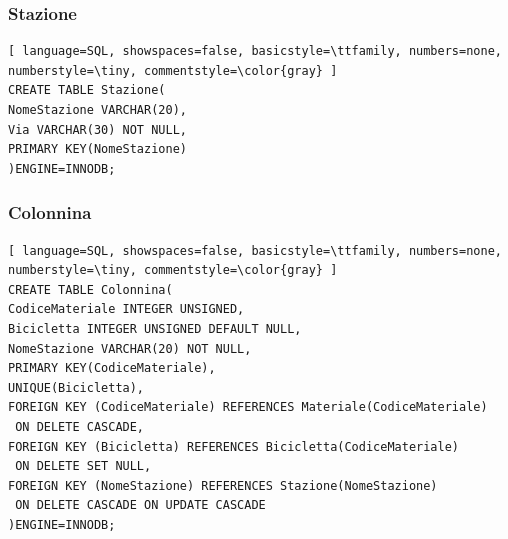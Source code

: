 \documentclass[a4paper,twoside]{article}
\begin{document}
\subsubsection{Stazione}
\begin{lstlisting}[ language=SQL, showspaces=false, basicstyle=\ttfamily, numbers=none, numberstyle=\tiny, commentstyle=\color{gray} ]
CREATE TABLE Stazione(
NomeStazione VARCHAR(20),
Via VARCHAR(30) NOT NULL,
PRIMARY KEY(NomeStazione)
)ENGINE=INNODB;
\end{lstlisting}
\subsubsection{Colonnina}
\begin{lstlisting}[ language=SQL, showspaces=false, basicstyle=\ttfamily, numbers=none, numberstyle=\tiny, commentstyle=\color{gray} ]
CREATE TABLE Colonnina(
CodiceMateriale INTEGER UNSIGNED,
Bicicletta INTEGER UNSIGNED DEFAULT NULL,
NomeStazione VARCHAR(20) NOT NULL,
PRIMARY KEY(CodiceMateriale),
UNIQUE(Bicicletta),
FOREIGN KEY (CodiceMateriale) REFERENCES Materiale(CodiceMateriale)
 ON DELETE CASCADE,
FOREIGN KEY (Bicicletta) REFERENCES Bicicletta(CodiceMateriale)
 ON DELETE SET NULL,
FOREIGN KEY (NomeStazione) REFERENCES Stazione(NomeStazione)
 ON DELETE CASCADE ON UPDATE CASCADE
)ENGINE=INNODB;
\end{lstlisting}
\end{document}
